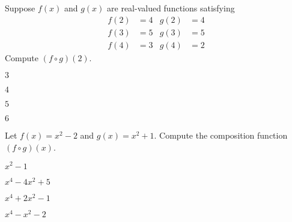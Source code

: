 \begin{readinessAssuranceTest}
\setcounter{enumi}{30}
\item Suppose $f(x)$ and $g(x)$ are real-valued functions satisfying
\begin{align*}
f(2) &= 4 & g(2) & = 4 \\
f(3) &= 5 & g(3) &= 5 \\
f(4) &= 3 & g(4) &= 2
\end{align*}
Compute $(f \circ g)(2)$.
\begin{multicols}{4}
\begin{readinessAssuranceTestChoices}
\item $3$ %
\item $4$
\item $5$
\item $6$
\end{readinessAssuranceTestChoices}
\end{multicols}

\item Let $f(x) = x^2-2$ and $g(x)= x^2+1$.  Compute the composition function $(f \circ g)(x)$.
\begin{multicols}{4}
\begin{readinessAssuranceTestChoices}
\item $x^2-1$
\item $x^4-4x^2+5$
\item $x^4+2x^2-1$ %
\item $x^4-x^2-2$
\end{readinessAssuranceTestChoices}
\end{multicols}




\end{readinessAssuranceTest}
